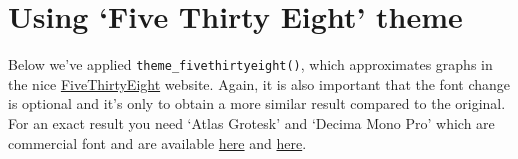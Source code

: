 \section{\texorpdfstring{Using `Five Thirty Eight'
theme}{Using Five Thirty Eight theme}}\label{using-five-thirty-eight-theme}

Below we've applied \texttt{theme\_fivethirtyeight()}, which
approximates graphs in the nice
\href{http://fivethirtyeight.com/}{FiveThirtyEight} website. Again, it
is also important that the font change is optional and it's only to
obtain a more similar result compared to the original. For an exact
result you need `Atlas Grotesk' and `Decima Mono Pro' which are
commercial font and are available
\href{https://commercialtype.com/catalog/atlas}{here} and
\href{https://www.myfonts.com/fonts/tipografiaramis/decima-mono-pro/}{here}.

